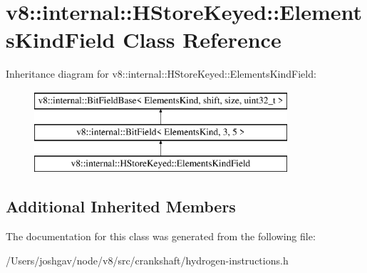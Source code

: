 \hypertarget{classv8_1_1internal_1_1_h_store_keyed_1_1_elements_kind_field}{}\section{v8\+:\+:internal\+:\+:H\+Store\+Keyed\+:\+:Elements\+Kind\+Field Class Reference}
\label{classv8_1_1internal_1_1_h_store_keyed_1_1_elements_kind_field}
Inheritance diagram for v8\+:\+:internal\+:\+:H\+Store\+Keyed\+:\+:Elements\+Kind\+Field\+:\begin{figure}[H]
\begin{center}
\leavevmode
\includegraphics[height=3.000000cm]{classv8_1_1internal_1_1_h_store_keyed_1_1_elements_kind_field}
\end{center}
\end{figure}
\subsection*{Additional Inherited Members}


The documentation for this class was generated from the following file\+:\begin{DoxyCompactItemize}
\item 
/\+Users/joshgav/node/v8/src/crankshaft/hydrogen-\/instructions.\+h\end{DoxyCompactItemize}
